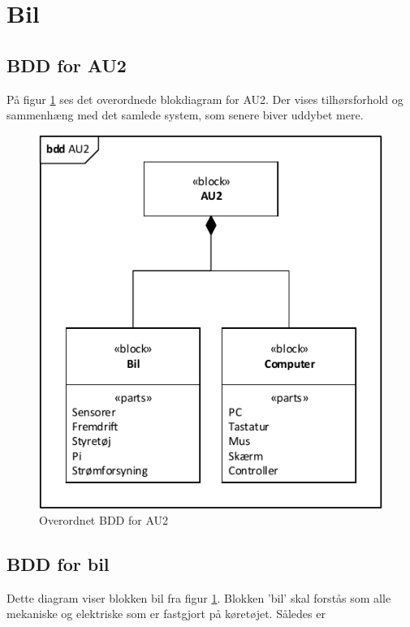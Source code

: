 \section{Bil}

\subsection{BDD for AU2}	%

På figur \ref{fig:bdd_au2} ses det overordnede blokdiagram for AU2. Der vises tilhørsforhold og sammenhæng med det samlede system, som senere biver uddybet mere.

\begin{figure}[h]
\centering
\includegraphics[scale=1]{../fig/diagrammer/bdd_au2.pdf}
\caption{Overordnet BDD for AU2}
\label{fig:bdd_au2}
\end{figure}

\clearpage

\subsection{BDD for bil} %

Dette diagram viser blokken bil fra figur \ref{fig:bdd_au2}. Blokken 'bil' skal forstås som alle mekaniske og elektriske som er fastgjort på køretøjet. Således er 

